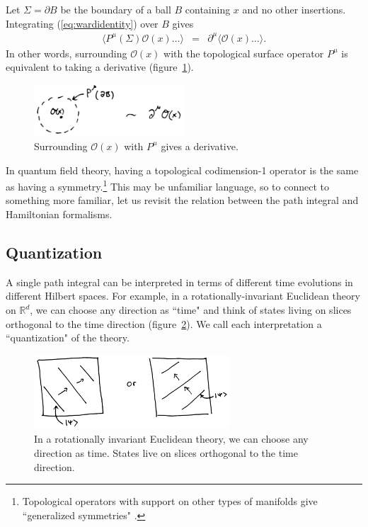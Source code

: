 \documentclass{ws-rv9x6}
\newcommand\be{\begin{eqnarray}}
\newcommand\ee{\end{eqnarray}}
\newcommand\cO{\mathcal{O}}
\newcommand\ptl\partial
\newcommand\<\langle
\renewcommand\>\rangle
\newcommand\R{\mathbb{R}}
\renewcommand\.{\cdot}
\begin{document}
Let $\Sigma=\ptl B$ be the boundary of a ball $B$ containing $x$ and no other insertions. Integrating (\ref{eq:wardidentity}) over $B$ gives
\be
\label{eq:integratedwardidentity}
\<P^\mu(\Sigma)\cO(x)\dots\> &=& \ptl^\mu\<\cO(x)\dots\>.
\ee
In other words, surrounding $\cO(x)$ with the topological surface operator $P^\mu$ is equivalent to taking a derivative (figure~\ref{fig:surroundoperator}).

\begin{figure}
\begin{center}
\includegraphics[width=0.5\textwidth]{surroundoperator.jpg}
\end{center}
\caption{\label{fig:surroundoperator} Surrounding $\cO(x)$ with $P^\mu$ gives a derivative.}
\end{figure}

In quantum field theory, having a topological codimension-1 operator is the same as having a symmetry.\footnote{Topological operators with support on other types of manifolds give ``generalized symmetries" \cite{Gaiotto:2014kfa}.}  This may be unfamiliar language, so to connect to something more familiar, let us revisit the relation between the path integral and Hamiltonian formalisms.


\subsection{Quantization}
\label{sec:quantization}

A single path integral can be interpreted in terms of different time evolutions in different Hilbert spaces.  For example, in a rotationally-invariant Euclidean theory on $\R^d$, we can choose any direction as ``time" and think of states living on slices orthogonal to the time direction (figure~\ref{fig:differentquantizations}).  We call each interpretation a ``quantization" of the theory.

\begin{figure}
\begin{center}
\includegraphics[width=0.65\textwidth]{differentquantizations.jpg}
\end{center}
\caption{\label{fig:differentquantizations} In a rotationally invariant Euclidean theory, we can choose any direction as time.  States live on slices orthogonal to the time direction.}
\end{figure}
\end{document}
